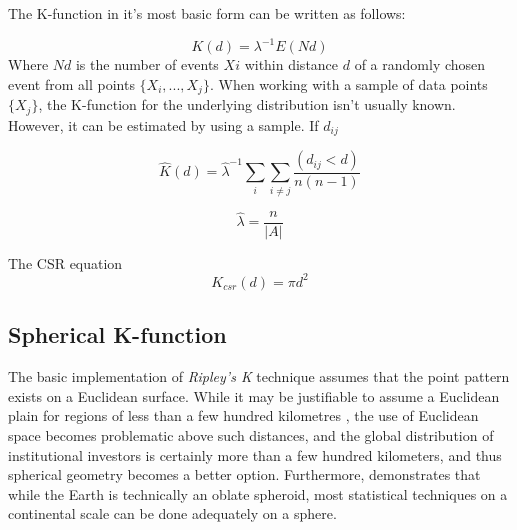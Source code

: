 The K-function in it's most basic form can be written as follows:  

\begin{equation}
K(d) = \lambda^{-1}E(Nd)
\end{equation}
Where $Nd$ is the number of events $Xi$ within distance $d$ of a randomly chosen event from all points $\{X_{i},...,X_{j} \}$.  When working with a sample of data points $\{ X_{j} \}$, the K-function for the underlying distribution isn't usually known.  However, it can be estimated by using a sample.  If $d_{ij}$ 

\begin{equation}
\hat{K}(d) = \hat{\lambda}^{-1}\sum_{i}\sum_{i \neq j}\dfrac{(d_{ij} < d)}{n(n-1)}
\end{equation}

\begin{equation}
    \hat{\lambda} = \dfrac{n}{|A|}
\end{equation}

The CSR equation
\begin{equation}
    K_{csr}(d) = \pi d^{2}
    \label{eq:csr}
\end{equation}

\cite{brunsdon2015introduction}

\subsection{Spherical K-function}

The basic implementation of \textit{Ripley's K} technique assumes that the point pattern exists on a Euclidean surface.  While it may be justifiable to assume a Euclidean plain for regions of less than a few hundred kilometres \citep{HeatherJ.Lynch2008,wilschut2015spatial},  the use of Euclidean space becomes problematic above such distances, and the global distribution of institutional investors is certainly more than a few hundred kilometers, and thus spherical geometry becomes a better option. Furthermore, \cite{Tobler2002} demonstrates that while the Earth is technically an oblate spheroid, most statistical techniques on a continental scale can be done adequately on a sphere.  


